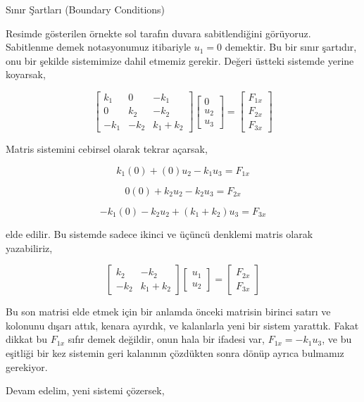 \documentclass[12pt,fleqn]{article}\usepackage{../../common}
\begin{document}
Sınır Şartları (Boundary Conditions)

Resimde gösterilen örnekte sol tarafın duvara sabitlendiğini görüyoruz.
Sabitlenme demek notasyonumuz itibariyle $u_1 = 0$ demektir. Bu bir
sınır şartıdır, onu bir şekilde sistemimize dahil etmemiz gerekir.
Değeri üstteki sistemde yerine koyarsak,

$$
\left[\begin{array}{ccc}
k_1 & 0 & -k_1 \\
0 & k_2 & -k_2 \\
-k_1 & -k_2 & k_1+k_2
\end{array}\right]
\left[\begin{array}{c}
0 \\ u_2 \\ u_3
\end{array}\right] =
\left[\begin{array}{c}
F_{1x} \\ F_{2x} \\ F_{3x}
\end{array}\right]
$$

Matris sistemini cebirsel olarak tekrar açarsak,

$$
k_1(0) + (0) u_2 - k_1 u_3 = F_{1x}
$$

$$
0(0) + k_2 u_2 - k_2 u_3 = F_{2x}
$$

$$
-k_1 (0) - k_2 u_2 + (k_1+k_2) u_3 = F_{3x}
$$

elde edilir. Bu sistemde sadece ikinci ve üçüncü denklemi matris olarak
yazabiliriz,

$$
\left[\begin{array}{cc}
k_2 & -k_2 \\ -k_2 & k_1 + k_2 
\end{array}\right]
\left[\begin{array}{c}
u_1 \\ u_2
\end{array}\right] =
\left[\begin{array}{c}
F_{2x} \\ F_{3x}
\end{array}\right]
$$

Bu son matrisi elde etmek için bir anlamda önceki matrisin birinci satırı ve
kolonunu dışarı attık, kenara ayırdık, ve kalanlarla yeni bir sistem yarattık.
Fakat dikkat bu $F_{1x}$ sıfır demek değildir, onun hala bir ifadesi var,
$F_{1x} = -k_1 u_3$, ve bu eşitliği bir kez sistemin geri kalanının çözdükten
sonra dönüp ayrıca bulmamız gerekiyor.

Devam edelim, yeni sistemi çözersek,
\end{document}
